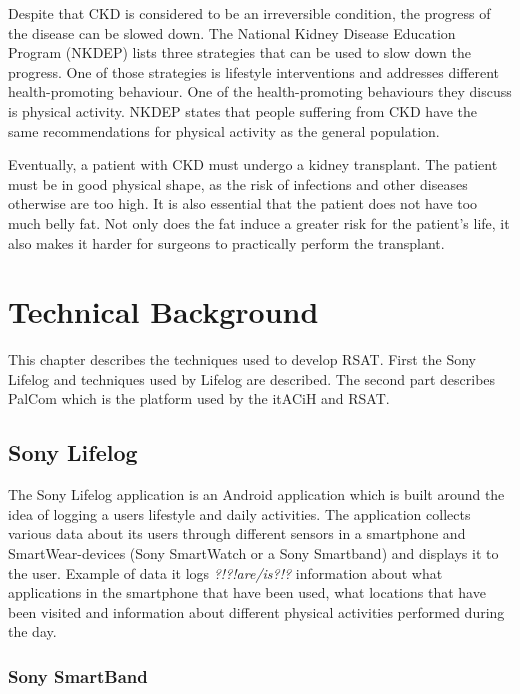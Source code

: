 \documentclass{cslthse-msc}
\begin{document}
Despite that CKD is considered to be an irreversible condition, the progress of the disease can be slowed down. The National Kidney Disease Education Program (NKDEP) lists three strategies that can be used to slow down the progress\cite{NKDEPPROG}. One of those strategies is lifestyle interventions and addresses different health-promoting behaviour. One of the health-promoting behaviours they discuss is physical activity. NKDEP states that people suffering from CKD have the same recommendations for physical activity as the general population. 

Eventually, a patient with CKD must undergo a kidney transplant. The patient must be in good physical shape, as the risk of infections and other diseases otherwise are too high. It is also essential that the patient does not have too much belly fat. Not only does the fat induce a greater risk for the patient's life, it also makes it harder for surgeons to practically perform the transplant. %

\chapter[Technical Background]{Technical Background}

This chapter describes the techniques used to develop RSAT. First the Sony Lifelog and techniques used by Lifelog are described. The second part describes PalCom which is the platform used by the itACiH and RSAT. 

\section{Sony Lifelog}

The Sony Lifelog application is an Android application which is built around the idea of logging a users lifestyle and daily activities\cite{LifeLogDescr}. The application collects various data about its users through different sensors in a smartphone and SmartWear-devices (Sony SmartWatch or a Sony Smartband) and displays it to the user. Example of data it logs \emph{?!?!are/is?!?} information about what applications in the smartphone that have been used, what locations that have been visited and information about different physical activities performed during the day.  

\subsection{Sony SmartBand}
\end{document}
